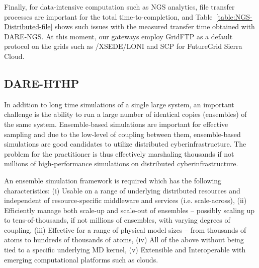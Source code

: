 \documentclass[]{svjour3}
\begin{document}
 

Finally, for data-intensive computation such as NGS analytics, file transfer
processes are important for the total time-to-completion, and
Table~\ref{table:NGS-Distributed-file} shows such issues with the
measured transfer time obtained with DARE-NGS. At this moment, our
gateways employ GridFTP as a default protocol on the grids such as
/XSEDE/LONI and SCP for FutureGrid Sierra Cloud.



\subsection{DARE-HTHP}

In addition to long time simulations of a single large system, an
important challenge is the ability to run a large number of identical
copies (ensembles) of the same system. Ensemble-based simulations are
important for effective sampling and due to the low-level of coupling
between them, ensemble-based simulations are good candidates to
utilize distributed cyberinfrastructure.  The problem for the
practitioner is thus effectively marshaling thousands if not millions
of high-performance simulations on distributed cyberinfrastructure.

An ensemble simulation framework is required which has the following
characteristics: (i) Usable on a range of underlying distributed
resources and independent of resource-specific middleware and services
(i.e. scale-across), (ii) Efficiently manage both scale-up and
scale-out of ensembles -- possibly scaling up to tens-of-thousands, if
not millions of ensembles, with varying degrees of coupling, (iii)
Effective for a range of physical model sizes -- from thousands of
atoms to hundreds of thousands of atoms, (iv) All of the above without
being tied to a specific underlying MD kernel, (v) Extensible and
Interoperable with emerging computational platforms such as
clouds. 
\end{document}
